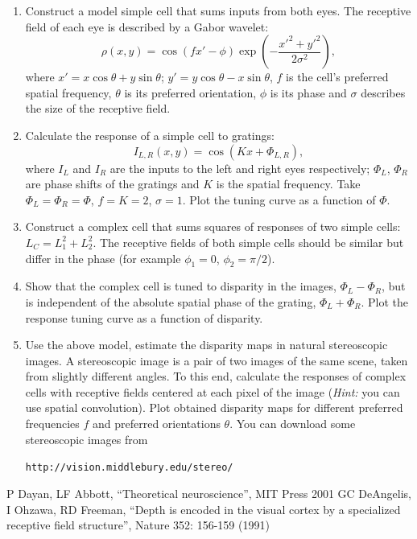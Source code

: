 \documentclass[12pt]{article}
\begin{document}
\begin{enumerate}
    \item \label{simplecell} Construct a model simple cell that sums inputs from both
        eyes. The receptive field of each eye is described by a  Gabor
        wavelet:
        $$\rho(x,y)=\cos(f x' -
        \phi)\exp\left(-\frac{x'^2+y'^2}{2\sigma^2}\right),$$
        where $x'=x \cos\theta+y\sin\theta$;
        $y'=y\cos\theta-x\sin\theta$, $f$ is the cell's preferred
        spatial frequency, $\theta$ is its preferred orientation,
        $\phi$ is its phase and $\sigma$ describes the size of the receptive
        field.
    \item Calculate the response of a simple cell to gratings:
        $$I_{L,R}(x,y)=\cos(Kx+\Phi_{L,R}),$$
        where $I_L$ and $I_R$ are the inputs to the left and right
        eyes respectively; $\Phi_L$, $\Phi_R$ are phase shifts of the
        gratings and $K$ is the spatial frequency. Take
        $\Phi_L=\Phi_R=\Phi$, $f=K=2$, $\sigma=1$.  Plot the tuning curve
        as a function of $\Phi$.
    \item Construct a complex cell that sums squares of responses of
        two simple cells: $L_C =
        L_1^2+L_2^2$. The receptive fields of both simple cells should
        be similar but differ in the phase (for example $\phi_1=0$,
        $\phi_2=\pi/2$).
    \item Show that the complex cell is tuned to disparity in the
        images, $\Phi_L-\Phi_R$, but is independent of the absolute
        spatial phase of the grating, $\Phi_L+\Phi_R$. Plot the
        response tuning curve as a function of disparity. 
    \item Use the above model, estimate the disparity maps in natural
        stereoscopic images. A stereoscopic image is a pair of two images of the same scene, taken from slightly different angles. To this end, calculate the responses of
        complex cells with receptive fields  centered  at each pixel of the image 
        (\textit{Hint:} you can use spatial convolution). Plot obtained disparity
        maps for different preferred frequencies $f$ and preferred
        orientations $\theta$. You can download some stereoscopic
        images from

	\texttt{http://vision.middlebury.edu/stereo/}
        
\end{enumerate}

\begin{thebibliography}{7}
     P Dayan, LF Abbott, ``Theoretical neuroscience'',
        MIT Press 2001
     GC DeAngelis, I Ohzawa, RD Freeman,
        ``Depth is encoded in the visual cortex by a specialized
        receptive field structure'', Nature 352: 156-159 (1991)
\end{thebibliography}
\end{document}
